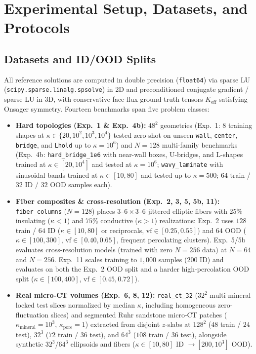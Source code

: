 \documentclass[preprint,11pt]{elsarticle}
\newcommand{\Keff}{K_{\mathrm{eff}}}
\begin{document}
\section{Experimental Setup, Datasets, and Protocols}\label{sec:setup}

\subsection{Datasets and ID/OOD Splits}
All reference solutions are computed in double precision (\texttt{float64}) via sparse LU (\texttt{scipy.\allowbreak sparse.\allowbreak linalg.\allowbreak spsolve}) in 2D and preconditioned conjugate gradient / sparse LU in 3D, with conservative face-flux ground-truth tensors $\Keff$ satisfying Onsager symmetry. Fourteen benchmarks span five problem classes:
\begin{itemize}
  \item \textbf{Hard topologies (Exp.~1 \& Exp.~4b):} $48^2$ geometries (Exp.~1: 8 training shapes at $\kappa \in \{20, 10^2, 10^3, 10^4\}$ tested zero-shot on unseen \texttt{wall}, \texttt{center}, \texttt{bridge}, and \texttt{Lhold} up to $\kappa = 10^6$) and $N=128$ multi-family benchmarks (Exp.~4b: \texttt{hard\_bridge\_1e6} with near-wall boxes, U-bridges, and L-shapes trained at $\kappa \in [20, 10^4]$ and tested at $\kappa = 10^6$; \texttt{wavy\_laminate} with sinusoidal bands trained at $\kappa \in [10, 80]$ and tested up to $\kappa = 500$; $64$ train / $32$ ID / $32$ OOD samples each).
  \item \textbf{Fiber composites \& cross-resolution (Exp.~2, 3, 5, 5b, 11):} \texttt{fiber\_columns} ($N=128$) places $3$--$6\times 3$--$6$ jittered elliptic fibers with $25\%$ insulating ($\kappa < 1$) and $75\%$ conductive ($\kappa > 1$) realizations: Exp.~2 uses $128$ train / $64$ ID ($\kappa \in [10, 80]$ or reciprocals, $\mathrm{vf} \in [0.25, 0.55]$) and $64$ OOD ($\kappa \in [100, 300]$, $\mathrm{vf} \in [0.40, 0.65]$, frequent percolating clusters). Exp.~5/5b evaluates cross-resolution models (trained with zero $N=256$ data) at $N=64$ and $N=256$. Exp.~11 scales training to $1{,}000$ samples ($200$ ID) and evaluates on both the Exp.~2 OOD split and a harder high-percolation OOD split ($\kappa \in [100, 400]$, $\mathrm{vf} \in [0.45, 0.72]$).
  \item \textbf{Real micro-CT volumes (Exp.~6, 8, 12):} \texttt{real\_ct\_32} ($32^2$ multi-mineral locked test slices normalized by median $\kappa$, including homogeneous zero-fluctuation slices) and segmented Ruhr sandstone micro-CT patches ($\kappa_{\mathrm{mineral}} = 10^3$, $\kappa_{\mathrm{pore}} = 1$) extracted from disjoint $z$-slabs at $128^2$ ($48$ train / $24$ test), $32^3$ ($72$ train / $36$ test), and $64^3$ ($108$ train / $36$ test), alongside synthetic $32^3$/$64^3$ ellipsoids and fibers ($\kappa \in [10, 80]$ ID $\to [200, 10^3]$ OOD).

\end{itemize}
\end{document}
